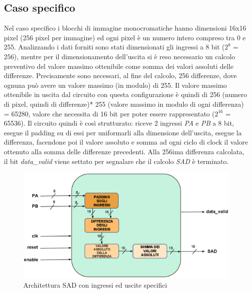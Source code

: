 \documentclass[12pt, a4paper]{article}
\begin{document}
\subsection{Caso specifico}
Nel caso specifico i blocchi di immagine monocromatiche hanno dimensioni 16x16 pixel (256 pixel per immagine) ed ogni pixel è un numero intero compreso tra 0 e 255.
Analizzando i dati forniti sono stati dimensionati gli ingressi a 8 bit ($2^8$ = 256), mentre per il dimensionamento dell'uscita si è reso necessario un calcolo preventivo del valore massimo ottenibile come somma dei valori assoluti delle differenze. Precisamente sono necessari, al fine del calcolo, 256 differenze, dove ognuna può avere un valore massimo (in modulo) di 255. Il valore massimo ottenibile in uscita dal circuito con questa configurazione è quindi di 256 (numero di pixel, quindi di differenze)* 255 (valore massimo in modulo di ogni differenza) = 65280, valore che necessita di 16 bit per poter essere rappresentato ($2^{16}$ = 65536).
Il circuito quindi è così strutturato: riceve 2 ingressi \textit{PA} e \textit{PB} a 8 bit, esegue il padding su di essi per uniformarli alla dimensione dell'uscita, esegue la differenza, facendone poi il valore assoluto e somma ad ogni ciclo di clock il valore ottenuto alla somma delle differenze precedenti. Alla 256ima differenza calcolata, il bit \textit{data\_valid} viene settato per segnalare che il calcolo \textit{SAD} è terminato.
\begin{figure}[h!]
\centering
\includegraphics[scale=0.3]{images/sad_general.eps}
\caption{Architettura SAD con ingressi ed uscite specifici}\label{fig:2}
\end{figure}
\end{document}
